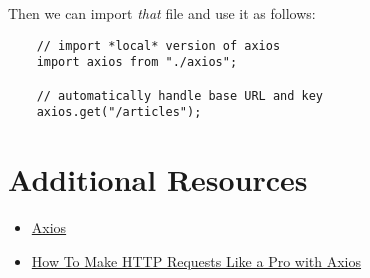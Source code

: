 Then we can import \textit{that} file and use it as follows:

\begin{verbatim}
    // import *local* version of axios
    import axios from "./axios";

    // automatically handle base URL and key
    axios.get("/articles");
\end{verbatim}



\section{Additional Resources}

\begin{itemize}[leftmargin=*]
    \item \href{https://github.com/axios/axios}{Axios}
    \item \href{https://blog.logrocket.com/how-to-make-http-requests-like-a-pro-with-axios/}{How To Make HTTP Requests Like a Pro with Axios}
\end{itemize}
